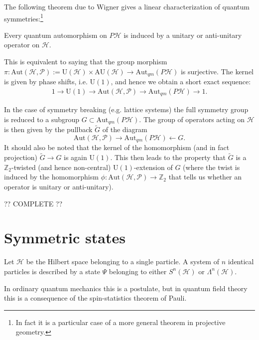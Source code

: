     The following theorem due to Wigner gives a linear characterization of quantum symmetries:\footnote{In fact it is a particular case of a more general theorem in projective geometry.}
    \begin{theorem}[Wigner]
        Every quantum automorphism on $P\mathcal{H}$ is induced by a unitary or anti-unitary operator on $\mathcal{H}$.
    \end{theorem}
    This is equivalent to saying that the group morphism $\pi:\text{Aut}(\mathcal{H}, \mathcal{P}):=\text{U}(\mathcal{H})\times\text{AU}(\mathcal{H})\rightarrow\text{Aut}_{qm}(P\mathcal{H})$ is surjective. The kernel is given by phase shifts, i.e. $\text{U}(1)$, and hence we obtain a short exact sequence:
    \begin{gather}
        1\longrightarrow\text{U}(1)\longrightarrow\text{Aut}(\mathcal{H}, \mathcal{P})\longrightarrow\text{Aut}_{qm}(P\mathcal{H})\longrightarrow1.
    \end{gather}

    In the case of symmetry breaking (e.g. lattice systems) the full symmetry group is reduced to a subgroup $G\subset\text{Aut}_{qm}(P\mathcal{H})$. The group of operators acting on $\mathcal{H}$ is then given by the pullback $\widetilde{G}$ of the diagram \[\text{Aut}(\mathcal{H}, \mathcal{P})\longrightarrow\text{Aut}_{qm}(P\mathcal{H})\longleftarrow G.\] It should also be noted that the kernel of the homomorphism (and in fact projection) $\widetilde{G}\rightarrow G$ is again $\text{U}(1)$. This then leads to the property that $\widetilde{G}$ is a $\mathbb{Z}_2$-twisted (and hence non-central) $\text{U}(1)$-extension of $G$ (where the twist is induced by the homomorphism $\phi:\text{Aut}(\mathcal{H}, \mathcal{P})\rightarrow\mathbb{Z}_2$ that tells us whether an operator is unitary or anti-unitary).

    ?? COMPLETE ??

\section{Symmetric states}

    \begin{axiom}
        Let $\mathcal{H}$ be the Hilbert space belonging to a single particle. A system of $n$ identical particles is described by a state $\Psi$ belonging to either $S^n(\mathcal{H})$ or $\Lambda^n(\mathcal{H})$.
    \end{axiom}
    \begin{remark}
        In ordinary quantum mechanics this is a postulate, but in quantum field theory this is a consequence of the spin-statistics theorem of Pauli.
    \end{remark}

